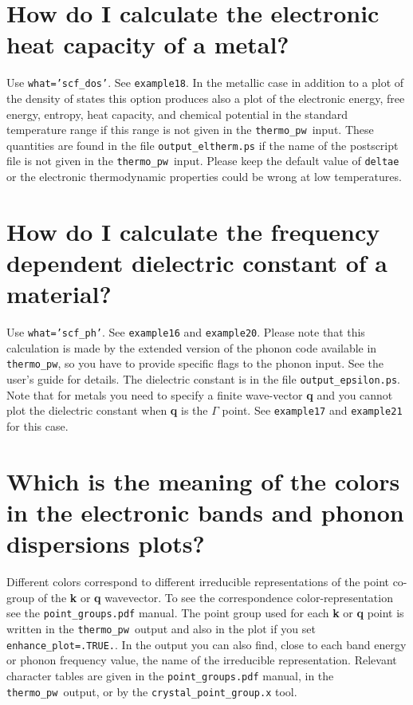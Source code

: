 \documentclass[12pt,a4paper]{article}
\def\thermo{\texttt{thermo\_pw}}
\begin{document}
\newpage
\section{\color{coral}How do I calculate the electronic heat capacity
of a metal?}
Use \texttt{what='scf\_dos'}. See \texttt{example18}. In the metallic
case in addition to a plot of the density of states this option produces
also a plot of the electronic energy, free energy, entropy, heat capacity,
and chemical potential in the standard temperature range if this range is
not given in the \thermo\ input. These quantities are found in the file
\texttt{output\_eltherm.ps} if the name of the postscript
file is not given in the \thermo\ input.
Please keep the default value of \texttt{deltae} or the electronic
thermodynamic properties could be wrong at low temperatures.

\newpage
\section{\color{coral}How do I calculate the frequency dependent dielectric
constant of a material?}
Use \texttt{what='scf\_ph'}. See \texttt{example16} and \texttt{example20}. 
Please note that this calculation is made by the extended version of the
phonon code available in \thermo, so you have to provide specific flags
to the phonon input. See the user's guide for details. 
The dielectric constant is in the file \texttt{output\_epsilon.ps}.
Note that for metals you need to specify a finite wave-vector {\bf q} and you 
cannot plot the dielectric constant when {\bf q} is the $\Gamma$ point.  
See \texttt{example17} and \texttt{example21} for this case. 

\newpage
\section{\color{coral} Which is the meaning of the colors in
the electronic bands and phonon dispersions plots?}
Different colors correspond to different irreducible representations of 
the point co-group of the {\bf k} or {\bf q} wavevector. To see the
correspondence color-representation see the \texttt{point\_groups.pdf} 
manual. The point group used for each {\bf k} or {\bf q} point is
written in the \thermo\ output and also in the plot if you set
\texttt{enhance\_plot=.TRUE.}. In the output you can also find,
close to each band energy or phonon frequency value, the name of the
irreducible representation. Relevant character tables are given in the
\texttt{point\_groups.pdf} manual, in the \thermo\ output, or by the
\texttt{crystal\_point\_group.x} tool.
\end{document}
